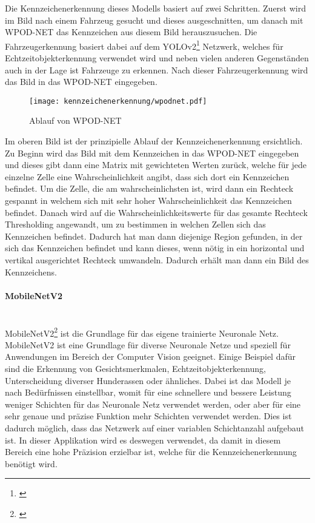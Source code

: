 Die Kennzeichenerkennung dieses Modells basiert auf zwei Schritten. Zuerst wird im Bild nach einem Fahrzeug gesucht und dieses ausgeschnitten, um danach mit 
WPOD-NET das Kennzeichen aus diesem Bild herauszusuchen. Die Fahrzeugerkennung basiert dabei auf dem 
YOLOv2\footnote{\cite{YOLO9000}} Netzwerk, 
welches für Echtzeitobjekterkennung verwendet wird und neben vielen anderen Gegenständen auch in der Lage ist Fahrzeuge zu erkennen. Nach dieser Fahrzeugerkennung wird das Bild in das WPOD-NET eingegeben.

\begin{figure}[H]
    \centering
    \texttt{[image: kennzeichenerkennung/wpodnet.pdf]}
    \caption{Ablauf von WPOD-NET}
\end{figure}

Im oberen Bild ist der prinzipielle Ablauf der Kennzeichenerkennung ersichtlich. Zu Beginn wird das Bild mit dem Kennzeichen in das WPOD-NET eingegeben 
und dieses gibt dann eine Matrix mit gewichteten Werten zurück, welche für jede einzelne Zelle eine Wahrscheinlichkeit angibt, dass sich dort ein Kennzeichen 
befindet. Um die Zelle, die am wahrscheinlichsten ist, wird dann ein Rechteck gespannt in welchem sich mit sehr hoher Wahrscheinlichkeit das Kennzeichen 
befindet. Danach wird auf die Wahrscheinlichkeitswerte für das gesamte Rechteck Thresholding angewandt, um zu bestimmen in welchen Zellen sich das Kennzeichen 
befindet. Dadurch hat man dann diejenige Region gefunden, in der sich das Kennzeichen befindet und kann dieses, wenn nötig in ein horizontal und vertikal 
ausgerichtet Rechteck umwandeln. Dadurch erhält man dann ein Bild des Kennzeichens.

\paragraph{MobileNetV2}\mbox{}\\
MobileNetV2\footnote{\cite{MobileNet}} ist die Grundlage für das eigene trainierte Neuronale Netz. MobileNetV2 ist eine Grundlage für diverse Neuronale Netze und speziell für Anwendungen im Bereich der Computer Vision 
geeignet. Einige Beispiel dafür sind die Erkennung von Gesichtsmerkmalen, Echtzeitobjekterkennung, Unterscheidung diverser Hunderassen oder ähnliches. Dabei ist das Modell je nach Bedürfnissen 
einstellbar, womit für eine schnellere und bessere Leistung weniger Schichten für das Neuronale Netz verwendet werden, oder aber für eine sehr genaue und präzise Funktion mehr Schichten verwendet werden. 
Dies ist dadurch möglich, dass das Netzwerk auf einer variablen Schichtanzahl aufgebaut ist. In dieser Applikation wird es deswegen verwendet, da damit in diesem Bereich eine hohe Präzision erzielbar ist, 
welche für die Kennzeichenerkennung benötigt wird.

